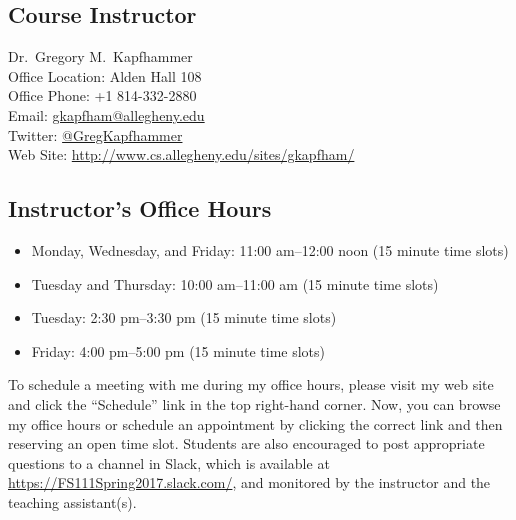 

\usepackage[compact]{titlesec}



\subsection*{Course Instructor}
Dr.\ Gregory M.\ Kapfhammer\\
\noindent Office Location: Alden Hall 108 \\
\noindent Office Phone: +1 814-332-2880 \\
\noindent Email: \url{gkapfham@allegheny.edu} \\
\noindent Twitter: \url{@GregKapfhammer} \\
\noindent Web Site: \url{http://www.cs.allegheny.edu/sites/gkapfham/}

\subsection*{Instructor's Office Hours}

\begin{itemize}
  \itemsep0em

  \item Monday, Wednesday, and Friday: 11:00 am--12:00 noon (15 minute time slots)

  \item Tuesday and Thursday: 10:00 am--11:00 am (15 minute time slots)

  \item Tuesday: 2:30 pm--3:30 pm (15 minute time slots)

  \item Friday: 4:00 pm--5:00 pm (15 minute time slots)

\end{itemize}

\vspace*{-.1in}

\noindent To schedule a meeting with me during my office hours, please visit my web site and click the ``Schedule'' link
in the top right-hand corner. Now, you can browse my office hours or schedule an appointment by clicking the correct
link and then reserving an open time slot. Students are also encouraged to post appropriate questions to a channel in
Slack, which is available at \url{https://FS111Spring2017.slack.com/}, and monitored by the instructor and the
teaching assistant(s).

